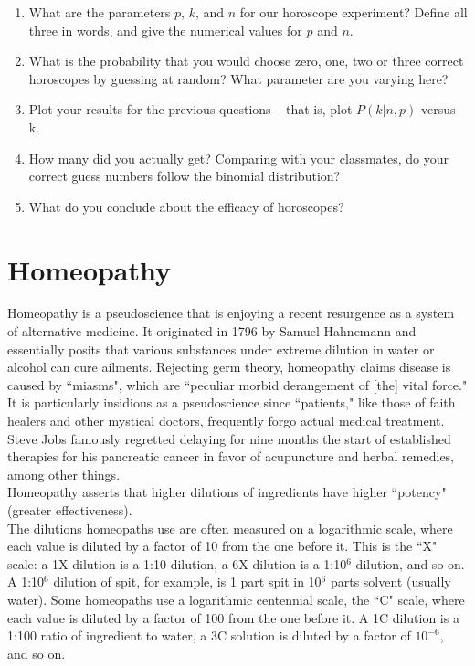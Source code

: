\documentclass[12pt]{article}
\begin{document}
\noindent 
\begin{enumerate}
\item What are the parameters $p$, $k$, and $n$ for our horoscope experiment? Define all three in words, and give the numerical values for $p$ and $n$. %
\item What is the probability that you would choose zero, one, two or three correct horoscopes by guessing at random? What parameter are you varying here? 
\item Plot your results for the previous questions -- that is, plot $P(k|n,p)$ versus k.
\item How many did you actually get? Comparing with your classmates, do your correct guess numbers follow the binomial distribution? 
\item What do you conclude about the efficacy of horoscopes?
\end{enumerate}

\section{Homeopathy}

Homeopathy is a pseudoscience that is enjoying a recent resurgence as a system of alternative medicine.  It originated in 1796 by Samuel Hahnemann and essentially posits that various substances under extreme dilution in water or alcohol can cure ailments. Rejecting germ theory, homeopathy claims disease is caused by ``miasms", which are ``peculiar morbid derangement of [the] vital force." It is particularly insidious as a pseudoscience since ``patients," like those of faith healers and other mystical doctors, frequently forgo actual medical treatment. Steve Jobs famously regretted delaying for nine months the start of established therapies for his pancreatic cancer in favor of acupuncture and herbal remedies, among other things. \\

\noindent Homeopathy asserts that higher dilutions of ingredients have higher ``potency" (greater effectiveness). \\

\noindent The dilutions homeopaths use are often measured on a logarithmic scale, where each value is diluted by a factor of 10 from the one before it. This is the ``X" scale: a 1X dilution is a 1:10 dilution, a 6X dilution is a 1:10$^6$ dilution, and so on. A 1:10$^6$ dilution of spit, for example, is 1 part spit in 10$^{6}$ parts solvent (usually water). Some homeopaths use a logarithmic centennial scale, the ``C" scale, where each value is diluted by a factor of 100 from the one before it. A 1C dilution is a 1:100 ratio of ingredient to water, a 3C solution is diluted by a factor of $10^{-6}$, and so on.
\end{document}
